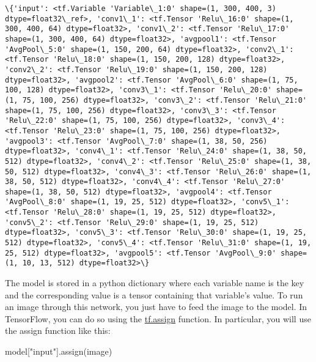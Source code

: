 \documentclass[11pt]{article}
\newenvironment{Shaded}{}{}
\newcommand{\StringTok}[1]{\textcolor[rgb]{0.25,0.44,0.63}{{#1}}}
\newcommand{\NormalTok}[1]{{#1}}
\begin{document}
    \begin{Verbatim}[commandchars=\\\{\}]
\{'input': <tf.Variable 'Variable\_1:0' shape=(1, 300, 400, 3) dtype=float32\_ref>, 'conv1\_1': <tf.Tensor 'Relu\_16:0' shape=(1, 300, 400, 64) dtype=float32>, 'conv1\_2': <tf.Tensor 'Relu\_17:0' shape=(1, 300, 400, 64) dtype=float32>, 'avgpool1': <tf.Tensor 'AvgPool\_5:0' shape=(1, 150, 200, 64) dtype=float32>, 'conv2\_1': <tf.Tensor 'Relu\_18:0' shape=(1, 150, 200, 128) dtype=float32>, 'conv2\_2': <tf.Tensor 'Relu\_19:0' shape=(1, 150, 200, 128) dtype=float32>, 'avgpool2': <tf.Tensor 'AvgPool\_6:0' shape=(1, 75, 100, 128) dtype=float32>, 'conv3\_1': <tf.Tensor 'Relu\_20:0' shape=(1, 75, 100, 256) dtype=float32>, 'conv3\_2': <tf.Tensor 'Relu\_21:0' shape=(1, 75, 100, 256) dtype=float32>, 'conv3\_3': <tf.Tensor 'Relu\_22:0' shape=(1, 75, 100, 256) dtype=float32>, 'conv3\_4': <tf.Tensor 'Relu\_23:0' shape=(1, 75, 100, 256) dtype=float32>, 'avgpool3': <tf.Tensor 'AvgPool\_7:0' shape=(1, 38, 50, 256) dtype=float32>, 'conv4\_1': <tf.Tensor 'Relu\_24:0' shape=(1, 38, 50, 512) dtype=float32>, 'conv4\_2': <tf.Tensor 'Relu\_25:0' shape=(1, 38, 50, 512) dtype=float32>, 'conv4\_3': <tf.Tensor 'Relu\_26:0' shape=(1, 38, 50, 512) dtype=float32>, 'conv4\_4': <tf.Tensor 'Relu\_27:0' shape=(1, 38, 50, 512) dtype=float32>, 'avgpool4': <tf.Tensor 'AvgPool\_8:0' shape=(1, 19, 25, 512) dtype=float32>, 'conv5\_1': <tf.Tensor 'Relu\_28:0' shape=(1, 19, 25, 512) dtype=float32>, 'conv5\_2': <tf.Tensor 'Relu\_29:0' shape=(1, 19, 25, 512) dtype=float32>, 'conv5\_3': <tf.Tensor 'Relu\_30:0' shape=(1, 19, 25, 512) dtype=float32>, 'conv5\_4': <tf.Tensor 'Relu\_31:0' shape=(1, 19, 25, 512) dtype=float32>, 'avgpool5': <tf.Tensor 'AvgPool\_9:0' shape=(1, 10, 13, 512) dtype=float32>\}

    \end{Verbatim}

    The model is stored in a python dictionary where each variable name is
the key and the corresponding value is a tensor containing that
variable's value. To run an image through this network, you just have to
feed the image to the model. In TensorFlow, you can do so using the
\href{https://www.tensorflow.org/api_docs/python/tf/assign}{tf.assign}
function. In particular, you will use the assign function like this:

\begin{Shaded}
\begin{Highlighting}[]
\NormalTok{model[}\StringTok{"input"}\NormalTok{].assign(image)}
\end{Highlighting}
\end{Shaded}
\end{document}
